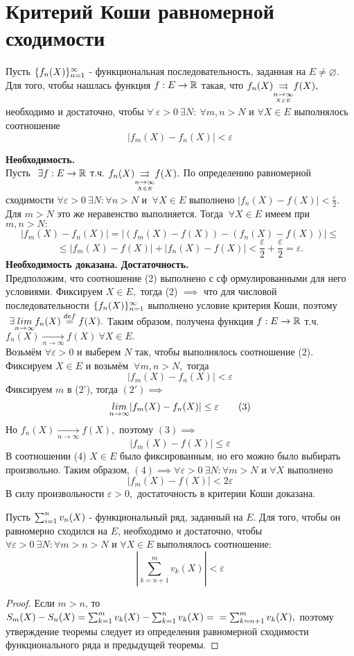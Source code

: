 \documentclass[main]{subfiles}
\begin{document}
\section{Критерий Коши равномерной сходимости}
\begin{theorem}
     Пусть $\fnn[f_n(X)]$ - функциональная последовательность, заданная на $E\neq\varnothing.$ 
     Для того, чтобы нашлась функция $f: E\to {\vR}$ такая, что 
     $f_n(X){\darrow{\underset{X\in E}{n\to\infty}}}  f(X),$
      необходимо и достаточно, чтобы $\forall\ \varepsilon>0\ \exists N:\ \forall m, n>N$ и 
      $\forall X\in E$ выполнялось соотношение 
\[ |f_m(X)-f_n(X)|<\varepsilon\tag{2} \] \end{theorem}
\begin{longProof} \textbf{Необходимость.} \\
     Пусть $\ \exists f:E\to{\vR}$ т.ч. $f_n(X){\darrow{\underset{X\in E}{n\to\infty}}}  f(X).$ 
     По определению равномерной сходимости $\forall \varepsilon>0 \ \exists N: \forall n>N$ и $\ \forall X\in E$
      выполнено $|f_n(X)-f(X)|<\frac{\varepsilon}{2}$. Для $m>N$ это же неравенство выполняется.
       Тогда $\ \forall X\in E$ имеем при $m,n>N:$ \[ |f_m(X)-f_n(X)|=|(f_m(X)-f(X))-(f_n(X)-f(X))|\leq\] 
       \[\leq|f_m(X)-f(X)|+|f_n(X)-f(X)|<\frac{\varepsilon}{2}+\frac{\varepsilon}{2}=\varepsilon. \] 
       \textbf{Необходимость доказана.}
\textbf{Достаточность.} \\
Предположим, что соотношение (2) выполнено с сф ормулированными для него условиями. 
Фиксируем $X\in E,$ тогда (2) $\implies$ что для числовой последовательности $\fnn[f_n(X)]$ выполнено условие критерия Коши, поэтому $\ \exists \Lim f_n(X)\overset{def}{=}f(X).$ Таким образом, получена функция $f:E\to {\vR}$ т.ч. $f_n(X)\underset{n\to\infty}{\to} f(X)\ \forall X\in E.$\\
Возьмём $\forall \varepsilon>0$ и выберем $N$ так, чтобы выполнялось соотношение (2). 
Фиксируем $X\in E$ и возьмём $\ \forall m, n>N,$ тогда \[ |f_m(X)-f_n(X)|<\varepsilon \tag{2'} \]
Фиксируем $m$ в (2'), тогда $(2')\implies$ 
\[\Lim |f_m(X)-f_n(X)|\leq\varepsilon\tag{3} \]
Но $f_n(X)\underset{n\to \infty}{\to}f(X),$ поэтому $(3)\implies$
 \[|f_m(X)-f(X)|\leq\varepsilon \tag{4}\]
В соотношении (4) $X\in E$ было фиксированным, но его можно было выбирать произвольно. Таким образом, $(4) \implies \forall\varepsilon>0\ \exists N: \forall m>N$ и $\forall X$ выполнено \[ |f_m(X)-f(X)|<2\varepsilon \]
В силу произвольности $\varepsilon>0,$ достаточность в критерии Коши доказана.
\end{longProof}
\begin{theorem} 
    Пусть $\sumn v_n(X)$ - функциональный ряд, заданный на $E$. Для того, чтобы он равномерно сходился на $E$,
     необходимо и достаточно, чтобы $\forall \varepsilon>0\ \exists N: \forall m>n>N$ 
     и $\forall X\in E$ выполнялось соотношение: \[ |\sum_{k=n+1}^m v_k(X)|<\varepsilon\tag{5} \]
\end{theorem}
\begin{proof}
     Если $m>n$, то $S_m(X)-S_n(X)=\sum_{k=1}^m v_k(X)-\sum_{k=1}^n
 v_k(X)=\\=\sum_{k=n+1}^m v_k(X),$ поэтому утверждение теоремы следует из 
 определения равномерной сходимости функционального ряда и предыдущей теоремы.
\end{proof}
\end{document}
